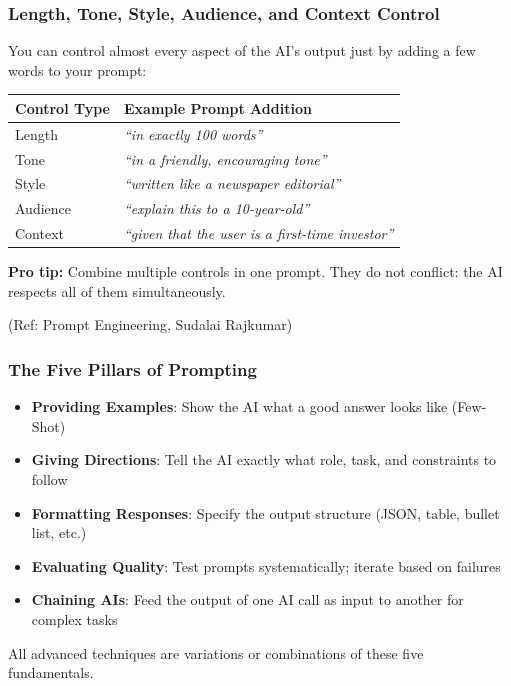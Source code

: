 \begin{frame}[fragile]\frametitle{Length, Tone, Style, Audience, and Context Control}

You can control almost every aspect of the AI's output just by adding a few words to your prompt:

\medskip
\begin{center}
\renewcommand{\arraystretch}{1.4}
\begin{tabular}{|l|p{5.5cm}|}
\hline
\textbf{Control Type} & \textbf{Example Prompt Addition} \\
\hline
Length & \emph{``in exactly 100 words''} \\
Tone & \emph{``in a friendly, encouraging tone''} \\
Style & \emph{``written like a newspaper editorial''} \\
Audience & \emph{``explain this to a 10-year-old''} \\
Context & \emph{``given that the user is a first-time investor''} \\
\hline
\end{tabular}
\end{center}

\medskip
\textbf{Pro tip:} Combine multiple controls in one prompt. They do not conflict: the AI respects all of them simultaneously.

{\tiny (Ref: Prompt Engineering, Sudalai Rajkumar)}

\end{frame}

\begin{frame}[fragile]\frametitle{The Five Pillars of Prompting}

\begin{itemize}
\item \textbf{Providing Examples}: Show the AI what a good answer looks like (Few-Shot)
\item \textbf{Giving Directions}: Tell the AI exactly what role, task, and constraints to follow
\item \textbf{Formatting Responses}: Specify the output structure (JSON, table, bullet list, etc.)
\item \textbf{Evaluating Quality}: Test prompts systematically; iterate based on failures
\item \textbf{Chaining AIs}: Feed the output of one AI call as input to another for complex tasks
\end{itemize}	

\medskip
All advanced techniques are variations or combinations of these five fundamentals.

\end{frame}

